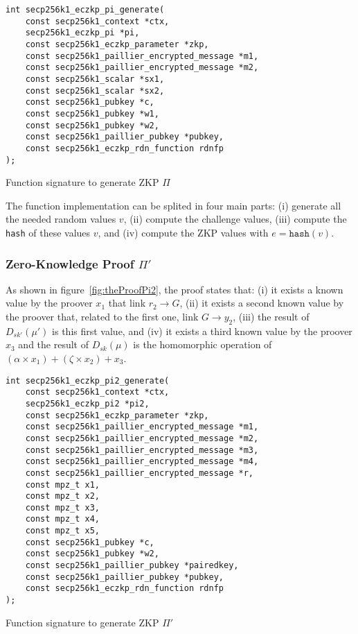 \begin{listing}
  \begin{verbatim}
int secp256k1_eczkp_pi_generate(
    const secp256k1_context *ctx,
    secp256k1_eczkp_pi *pi,
    const secp256k1_eczkp_parameter *zkp,
    const secp256k1_paillier_encrypted_message *m1,
    const secp256k1_paillier_encrypted_message *m2,
    const secp256k1_scalar *sx1,
    const secp256k1_scalar *sx2,
    const secp256k1_pubkey *c,
    const secp256k1_pubkey *w1,
    const secp256k1_pubkey *w2,
    const secp256k1_paillier_pubkey *pubkey,
    const secp256k1_eczkp_rdn_function rdnfp
);
  \end{verbatim}
	\caption{Function signature to generate ZKP $\Pi$}
	\label{lst:funcSigGeneratePi}
\end{listing}

The function implementation can be splited in four main parts: (i) generate all
the needed random values $v$, (ii) compute the challenge values, (iii) compute the \texttt{hash}
of these values $v$, and (iv) compute the ZKP values with $e = \texttt{hash}(v)$.

\subsubsection{Zero-Knowledge Proof $\Pi'$}

As shown in figure~\ref{fig:theProofPi2}, the proof states that: (i) it exists a known value by
the proover $x_1$ that link $r_2 \rightarrow G$, (ii) it exists a second known value by
the proover that, related to the first one, link $G \rightarrow y_2$, (iii) the
result of $D_{sk'}(\mu')$ is this first value, and (iv) it exists a third known
value by the proover $x_3$ and the result of $D_{sk}(\mu)$ is the homomorphic operation
of $(\alpha \times x_1) + (\zeta \times x_2) + x_3$.

\begin{listing}
  \begin{verbatim}
int secp256k1_eczkp_pi2_generate(
    const secp256k1_context *ctx,
    secp256k1_eczkp_pi2 *pi2,
    const secp256k1_eczkp_parameter *zkp,
    const secp256k1_paillier_encrypted_message *m1,
    const secp256k1_paillier_encrypted_message *m2,
    const secp256k1_paillier_encrypted_message *m3,
    const secp256k1_paillier_encrypted_message *m4,
    const secp256k1_paillier_encrypted_message *r,
    const mpz_t x1,
    const mpz_t x2,
    const mpz_t x3,
    const mpz_t x4,
    const mpz_t x5,
    const secp256k1_pubkey *c,
    const secp256k1_pubkey *w2,
    const secp256k1_paillier_pubkey *pairedkey,
    const secp256k1_paillier_pubkey *pubkey,
    const secp256k1_eczkp_rdn_function rdnfp
);
  \end{verbatim}
	\caption{Function signature to generate ZKP $\Pi'$}
	\label{lst:funcSigGeneratePi2}
\end{listing}

